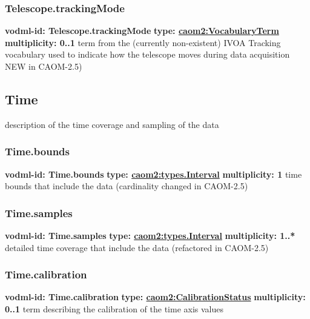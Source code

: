     \subsubsection{Telescope.trackingMode}
      \textbf{vodml-id: Telescope.trackingMode} \newline
      \textbf{type: \hyperref[sect:VocabularyTerm]{caom2:VocabularyTerm}} \newline
      \textbf{multiplicity: 0..1} \newline
      term from the (currently non-existent) IVOA Tracking vocabulary used to indicate how the telescope moves during data acquisition NEW in CAOM-2.5)

  \subsection{Time}
  \label{sect:Time}
    description of the time coverage and sampling of the data

    \subsubsection{Time.bounds}
      \textbf{vodml-id: Time.bounds} \newline
      \textbf{type: \hyperref[sect:types.Interval]{caom2:types.Interval}} \newline
      \textbf{multiplicity: 1} \newline
      time bounds that include the data (cardinality changed in CAOM-2.5)

    \subsubsection{Time.samples}
      \textbf{vodml-id: Time.samples} \newline
      \textbf{type: \hyperref[sect:types.Interval]{caom2:types.Interval}} \newline
      \textbf{multiplicity: 1..*} \newline
      detailed time coverage that include the data (refactored in CAOM-2.5)

    \subsubsection{Time.calibration}
      \textbf{vodml-id: Time.calibration} \newline
      \textbf{type: \hyperref[sect:CalibrationStatus]{caom2:CalibrationStatus}} \newline
      \textbf{multiplicity: 0..1} \newline
      term describing the calibration of the time axis values

